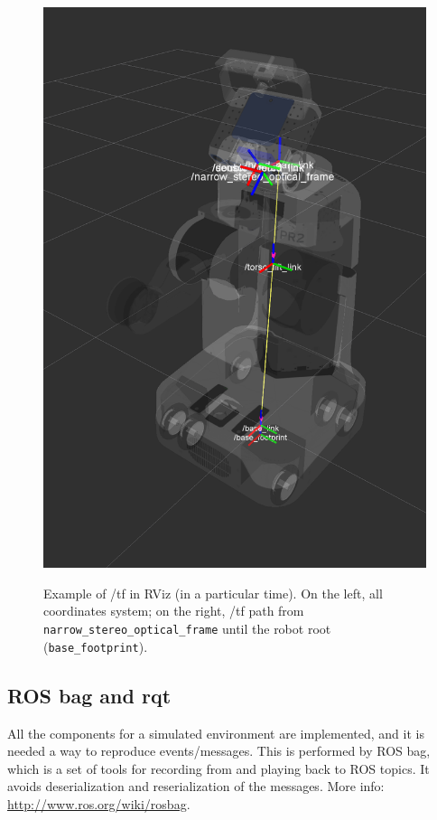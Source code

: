 \begin{figure}[!htbp]
{    \centering\includegraphics[height=0.3\textheight]{images/screenshots/tf02.png}
    \label{fig:tf02}
  }
  \caption{Example of /tf in RViz (in a particular time). On the left, all coordinates system; on the right, /tf path from \texttt{narrow\_stereo\_optical\_frame} until the robot root (\texttt{base\_footprint}).}
   \label{fig:tf}
\end{figure}


\subsection{ROS bag and rqt}
\label{sec:rosbag}

All the components for a simulated environment are implemented, and it is needed a way to reproduce events/messages. This is performed by ROS bag, which is a set of tools for recording from and playing back to ROS topics. It avoids deserialization and reserialization of the messages. More info: \url{http://www.ros.org/wiki/rosbag}.

